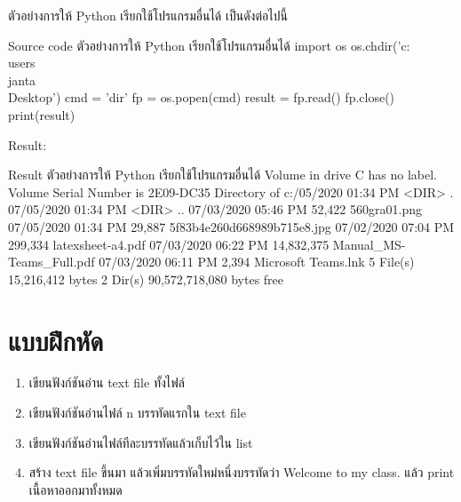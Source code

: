 ตัวอย่างการให้ Python เรียกใช้โปรแกรมอื่นได้ เป็นดังต่อไปนี้

\begin{codelist}{Source code ตัวอย่างการให้ Python เรียกใช้โปรแกรมอื่นได้}{}
import os
os.chdir('c:\\users\\janta\\Desktop')
cmd = 'dir'
fp = os.popen(cmd)
result = fp.read()
fp.close()
print(result)

\end{codelist}

Result:
\begin{codelist}{Result ตัวอย่างการให้ Python เรียกใช้โปรแกรมอื่นได้}{}
Volume in drive C has no label.
Volume Serial Number is 2E09-DC35
Directory of c:\users\janta{}/05/2020  01:34 PM    <DIR>          .
07/05/2020  01:34 PM    <DIR>          ..
07/03/2020  05:46 PM            52,422 560gra01.png
07/05/2020  01:34 PM            29,887 5f83b4e260d668989b715e8.jpg
07/02/2020  07:04 PM           299,334 latexsheet-a4.pdf
07/03/2020  06:22 PM        14,832,375 Manual_MS-Teams_Full.pdf
07/03/2020  06:11 PM             2,394 Microsoft Teams.lnk
               5 File(s)     15,216,412 bytes
               2 Dir(s)  90,572,718,080 bytes free
\end{codelist}



\section{แบบฝึกหัด}
\begin{enumerate} 
\item 	เขียนฟังก์ชันอ่าน text file ทั้งไฟล์
\item 	เขียนฟังก์ชันอ่านไฟล์ n บรรทัดแรกใน text file
\item 	เขียนฟังก์ชันอ่านไฟล์ทีละบรรทัดแล้วเก็บไว้ใน list
\item 	สร้าง text file ขึ้นมา แล้วเพิ่มบรรทัดใหม่หนึ่งบรรทัดว่า Welcome to my class. แล้ว print เนื้อหาออกมาทั้งหมด
\end{enumerate}



